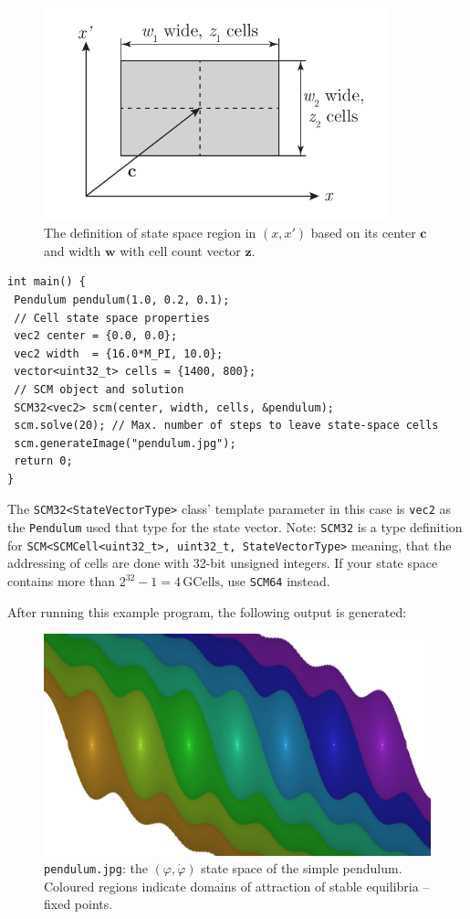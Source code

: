 \documentclass[11pt]{article}
\begin{document}
\begin{figure}[htb]
	\centering
	\includegraphics[width=10cm]{fig/state-space-region.pdf}
	\caption{The definition of state space region in $(x,x')$ based on its center $\mathbf{c}$ and width $\mathbf{w}$ with cell count vector $\mathbf{z}$.} \label{fig:statespace}
\end{figure}

\begin{lstlisting}
int main() {
 Pendulum pendulum(1.0, 0.2, 0.1);
 // Cell state space properties
 vec2 center = {0.0, 0.0};
 vec2 width  = {16.0*M_PI, 10.0};
 vector<uint32_t> cells = {1400, 800};
 // SCM object and solution
 SCM32<vec2> scm(center, width, cells, &pendulum);
 scm.solve(20); // Max. number of steps to leave state-space cells
 scm.generateImage("pendulum.jpg");
 return 0;
}
\end{lstlisting}
The \texttt{SCM32<StateVectorType>} class' template parameter in this case is \texttt{vec2} as the \texttt{Pendulum} used that type for the state vector. Note: \texttt{SCM32} is a type definition for \texttt{SCM<SCMCell<uint32\_t>, uint32\_t, StateVectorType>} meaning, that the addressing of cells are done with 32-bit unsigned integers. If your state space contains more than $2^{32}-1 = 4\,\mathrm{GCells}$, use \texttt{SCM64} instead.

After running this example program, the following output is generated:

\begin{figure}[h]
	\centering
	\includegraphics[width=14cm]{fig/pendulum.jpg}
	\caption{\texttt{pendulum.jpg}: the $(\varphi, \dot\varphi)$ state space of the simple pendulum. Coloured regions indicate domains of attraction of stable equilibria -- fixed points.}
\end{figure}
\end{document}

